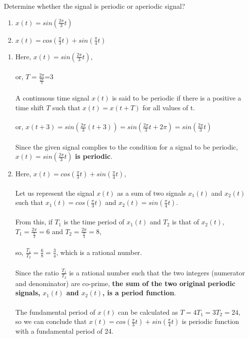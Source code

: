 \documentclass{article}[12 pt]
\begin{document}
\begin{problem}
{Determine whether the signal is periodic or aperiodic signal?
\begin{enumerate}
    \item $x(t)=sin(\frac{2\pi}{3}t)$
    \item $x(t)=cos(\frac{\pi}{3}t)+sin(\frac{\pi}{4}t)$
\end{enumerate}
}
\end{problem}
\begin{solution}
{
\begin{enumerate}
    \item Here, $x(t)=sin(\frac{2\pi}{3}t)$,\\\\
    or, $T=\frac{2\pi}{\frac{2\pi}{3}}$=3\\\\A continuous time signal $x(t)$ is said to be periodic if there is a positive a time shift $T$ such that $x(t)=x(t+T)$ for all values of t.\\\\or, $x(t+3)=sin(\frac{2\pi}{3} (t + 3))=sin(\frac{2\pi}{3} t + 2\pi)=sin(\frac{2\pi}{3} t)$\\\\
    Since the given signal complies to the condition for a signal to be periodic,  $x(t)=sin(\frac{2\pi}{3}t)$ \textbf{is periodic}.
    \item Here, $x(t)=cos(\frac{\pi}{3}t)+sin(\frac{\pi}{4}t)$,\\\\Let us represent the signal $x(t)$ as a sum of two signals $x_1(t)$ and $x_2(t)$ such that $x_1(t)=cos(\frac{\pi}{3}t)$ and $x_2(t)=sin(\frac{\pi}{4}t)$.\\\\
    From this, if $T_1$ is the time period of $x_1(t)$ and $T_2$ is that of $x_2(t)$,\\
    $T_1=\frac{2\pi}{\frac{\pi}{3}}=6$ and $T_2=\frac{2\pi}{\frac{\pi}{4}}=8$,\\\\
    so, $\frac{T_1}{T_2}=\frac{6}{8}=\frac{3}{4}$, which is a rational number. \\\\Since the ratio $\frac{T_1}{T_2}$ is a rational number such that the two integers (numerator and denominator) are co-prime,\textbf{ the sum of the two original periodic signals, $x_1(t)$ and $x_2(t)$, is a period function}.\\\\
    The fundamental period of $x(t)$ can be calculated as $T=4T_1=3T_2=24$, so we can conclude that $x(t)=cos(\frac{\pi}{3}t)+sin(\frac{\pi}{4}t)$ is periodic function with a fundamental period of 24.
\end{enumerate}}\end{solution}
\end{document}
